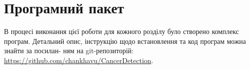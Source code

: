 
\chapter{Програмний пакет} %

\label{AppendixA} %

В процесі виконання цієї роботи для кожного розділу було створено комплекс програм. Детальний опис, інструкцію щодо встановлення та код програм можна знайти за посилан- ням на git-репозиторій: \href{https://github.com/chankhavu/CancerDetection}{https://github.com/chankhavu/CancerDetection}.